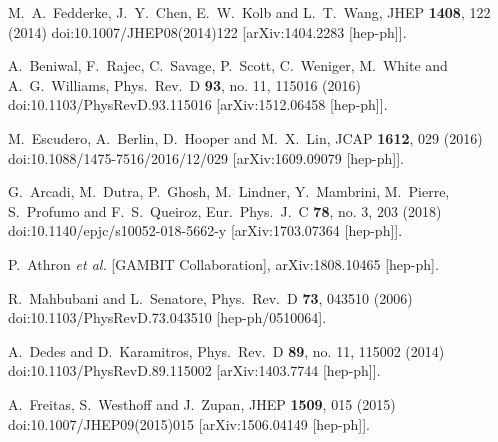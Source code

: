 \documentclass[nofootinbib,prd,aps,superscriptaddress,preprintnumbers]{revtex4}
\begin{document}
\begin{thebibliography}{99}

  M.~A.~Fedderke, J.~Y.~Chen, E.~W.~Kolb and L.~T.~Wang,
  JHEP {\bf 1408}, 122 (2014)
  doi:10.1007/JHEP08(2014)122
  [arXiv:1404.2283 [hep-ph]].

  A.~Beniwal, F.~Rajec, C.~Savage, P.~Scott, C.~Weniger, M.~White and A.~G.~Williams,
  Phys.\ Rev.\ D {\bf 93}, no. 11, 115016 (2016)
  doi:10.1103/PhysRevD.93.115016
  [arXiv:1512.06458 [hep-ph]].

  M.~Escudero, A.~Berlin, D.~Hooper and M.~X.~Lin,
  JCAP {\bf 1612}, 029 (2016)
  doi:10.1088/1475-7516/2016/12/029
  [arXiv:1609.09079 [hep-ph]].

  G.~Arcadi, M.~Dutra, P.~Ghosh, M.~Lindner, Y.~Mambrini, M.~Pierre, S.~Profumo and F.~S.~Queiroz,
  Eur.\ Phys.\ J.\ C {\bf 78}, no. 3, 203 (2018)
  doi:10.1140/epjc/s10052-018-5662-y
  [arXiv:1703.07364 [hep-ph]].

  P.~Athron {\it et al.} [GAMBIT Collaboration],
  arXiv:1808.10465 [hep-ph].

  R.~Mahbubani and L.~Senatore,
  Phys.\ Rev.\ D {\bf 73}, 043510 (2006)
  doi:10.1103/PhysRevD.73.043510
  [hep-ph/0510064].

  A.~Dedes and D.~Karamitros,
  Phys.\ Rev.\ D {\bf 89}, no. 11, 115002 (2014)
  doi:10.1103/PhysRevD.89.115002
  [arXiv:1403.7744 [hep-ph]].

  A.~Freitas, S.~Westhoff and J.~Zupan,
  JHEP {\bf 1509}, 015 (2015)
  doi:10.1007/JHEP09(2015)015
  [arXiv:1506.04149 [hep-ph]].


\end{thebibliography}
\end{document}
